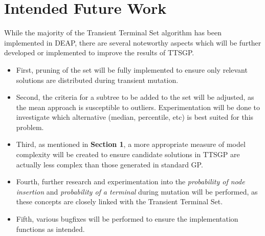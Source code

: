 \documentclass[a4paper]{article}
\begin{document}
\section{Intended Future Work}
While the majority of the Transient Terminal Set algorithm has been implemented in DEAP, there are several noteworthy aspects which will be further developed or implemented to improve the results of TTSGP. \begin{itemize}
	\item First, pruning of the set will be fully implemented to ensure only relevant solutions are distributed during transient mutation.
	\item Second, the criteria for a subtree to be added to the set will be adjusted, as the mean approach is susceptible to outliers. Experimentation will be done to investigate which alternative (median, percentile, etc) is best suited for this problem.
	\item Third, as mentioned in \textbf{Section 1}, a more appropriate measure of model complexity will be created to ensure candidate solutions in TTSGP are actually less complex than those generated in standard GP.
	\item Fourth, further research and experimentation into the \textit{probability of node insertion} and \textit{probability of a terminal} during mutation will be performed, as these concepts are closely linked with the Transient Terminal Set.
	\item Fifth, various bugfixes will be performed to ensure the implementation functions as intended.
\end{itemize}
\end{document}
